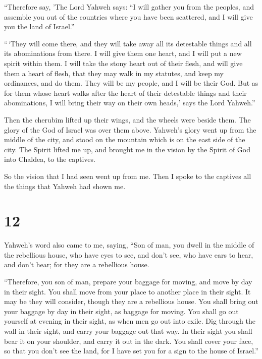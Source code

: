  ``Therefore say, 'The Lord Yahweh says: ``I will gather
you from the peoples, and assemble you out of the countries where you
have been scattered, and I will give you the land of Israel.''

 ``\,`They will come there, and they will take away all
its detestable things and all its abominations from there.
 I will give them one heart, and I will put a new spirit
within them. I will take the stony heart out of their flesh, and will
give them a heart of flesh,  that they may walk in my
statutes, and keep my ordinances, and do them. They will be my people,
and I will be their God.  But as for them whose heart
walks after the heart of their detestable things and their abominations,
I will bring their way on their own heads,' says the Lord Yahweh.''

 Then the cherubim lifted up their wings, and the wheels
were beside them. The glory of the God of Israel was over them above.
 Yahweh's glory went up from the middle of the city, and
stood on the mountain which is on the east side of the city.
 The Spirit lifted me up, and brought me in the vision by
the Spirit of God into Chaldea, to the captives.

So the vision that I had seen went up from me.  Then I
spoke to the captives all the things that Yahweh had shown me.

\hypertarget{section-10}{%
\section{12}\label{section-10}}

 Yahweh's word also came to me, saying, 
``Son of man, you dwell in the middle of the rebellious house, who have
eyes to see, and don't see, who have ears to hear, and don't hear; for
they are a rebellious house.

 ``Therefore, you son of man, prepare your baggage for
moving, and move by day in their sight. You shall move from your place
to another place in their sight. It may be they will consider, though
they are a rebellious house.  You shall bring out your
baggage by day in their sight, as baggage for moving. You shall go out
yourself at evening in their sight, as when men go out into exile.
 Dig through the wall in their sight, and carry your
baggage out that way.  In their sight you shall bear it on
your shoulder, and carry it out in the dark. You shall cover your face,
so that you don't see the land, for I have set you for a sign to the
house of Israel.''

